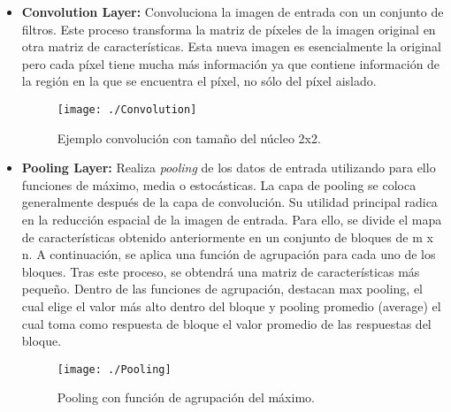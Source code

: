 \documentclass[a4paper, 12pt, spanish, chapterprefix, numbers=noenddot]{book}
\begin{document}
\begin{itemize}
\item \textbf{Convolution Layer:} Convoluciona la imagen de entrada con un conjunto de filtros. Este proceso transforma la matriz de píxeles de la imagen original en otra matriz de características. Esta nueva imagen es esencialmente la original pero cada píxel tiene mucha más información ya que contiene información de la región en la que se encuentra el píxel, no sólo del píxel aislado.\\

\begin{figure}[H]
\begin{center}
\texttt{[image: ./Convolution]}
\caption{Ejemplo convolución con tamaño del núcleo 2x2.}
\end{center}
\end{figure}

\item \textbf{Pooling Layer:} Realiza \textit{pooling} de los datos de entrada utilizando para ello funciones de máximo, media o estocásticas. La capa de pooling se coloca generalmente después de la capa de convolución. Su utilidad principal radica en la reducción espacial de la imagen de entrada. Para ello, se divide el mapa de características obtenido anteriormente en un conjunto de bloques de m x n. A continuación, se aplica una función de agrupación para cada uno de los bloques. Tras este proceso, se obtendrá una matriz de características más pequeño. Dentro de las funciones de agrupación, destacan max pooling, el cual elige el valor más alto dentro del bloque y pooling promedio (average) el cual toma como respuesta de bloque el valor promedio de las respuestas del bloque.\\

\begin{figure}[H]
\begin{center}
\texttt{[image: ./Pooling]}
\caption{Pooling con función de agrupación del máximo.}
\end{center}
\end{figure}
\begin{comment}
\item \textbf{Spatial Pyramid Pooling (SPP)} 
\item \textbf{Crop}
\item \textbf{Deconvolution Layer:} Realiza uno convolución transpuesta.
\item \textbf{Im2Col}
\end{comment}
\end{itemize}
\end{document}
